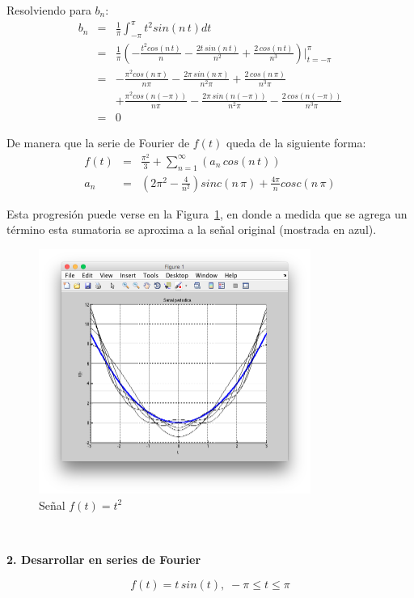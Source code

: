 \documentclass[twocolumn]{article}
\begin{document}
Resolviendo para $b_n$:
\begin{eqnarray*}
b_n &=& \frac{1}{\pi}\int_{-\pi}^{\pi}t^2sin(n\,t)dt\\
&=& \frac{1}{\pi} \left(-\frac{t^2cos(n\,t)}{n} - \frac{2t\,sin(n\,t)}{n^2} + \frac{2\,cos(n\,t)}{n^3}\right)\bigg|_{t=-\pi}^{\pi}\\
&=& -\frac{\pi^2cos(n\,\pi)}{n\pi} - \frac{2\pi\,sin(n\,\pi)}{n^2\pi} + \frac{2\,cos(n\,\pi)}{n^3\pi}\\
& &+ \frac{\pi^2cos(n(-\pi))}{n\pi} - \frac{2\pi\,sin(n(-\pi))}{n^2\pi} - \frac{2\,cos(n(-\pi))}{n^3\pi}\\
&=& 0
\end{eqnarray*}

De manera que la serie de Fourier de $f(t)$ queda de la siguiente forma:
\begin{eqnarray*}
f(t) &=& \frac{\pi^2}{3} + \sum_{n=1}^\infty\left(a_n\,cos(n\,t)\right)\\
a_n &=& \left(2\pi^2  - \frac{4}{n^2} \right) sinc(n\,\pi) + \frac{4\pi}{n}cosc(n\,\pi)
\end{eqnarray*}

Esta progresión puede verse en la Figura~\ref{fig_1}, en donde a medida que se agrega un término esta sumatoria se aproxima a la señal original (mostrada en azul).

\begin{figure}[!t]
\centering
\includegraphics[width=3.5in]{imgs/sqrt.png}
\caption{Señal $f(t) = t^2$}
\label{fig_1}
\end{figure}

$\,$

\textbf{2. Desarrollar en series de Fourier}

$$f(t) = t \, sin(t),\; -\pi \leq t \leq \pi$$
\end{document}
